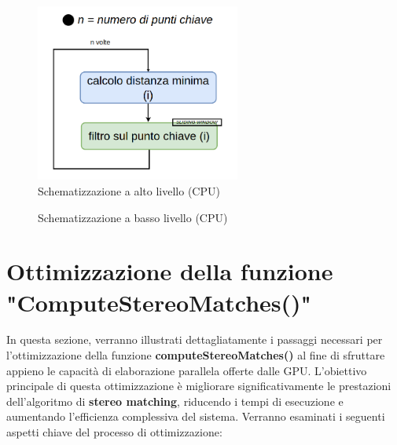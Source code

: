 \documentclass[12pt,a4paper]{report}
\begin{document}
\begin{figure}[H]
    \centering
    \includegraphics[width=0.6\textwidth]{img/sliding_window_high.png}
    \caption{Schematizzazione a alto livello (CPU) }
\end{figure}

\begin{figure}[H]
    \centering
    \caption{Schematizzazione a basso livello (CPU) }
\end{figure}

\newpage
\section{Ottimizzazione della funzione "ComputeStereoMatches()" } \label{ottimizzazione-computeStereo}

In questa sezione, verranno illustrati dettagliatamente i passaggi necessari per l'ottimizzazione della funzione \textbf{computeStereoMatches()} al fine di sfruttare appieno le capacità di elaborazione parallela offerte dalle GPU. L'obiettivo principale di questa ottimizzazione è migliorare significativamente le prestazioni dell'algoritmo di \textbf{stereo matching}, riducendo i tempi di esecuzione e aumentando l'efficienza complessiva del sistema.
Verranno esaminati i seguenti aspetti chiave del processo di ottimizzazione:
\end{document}
